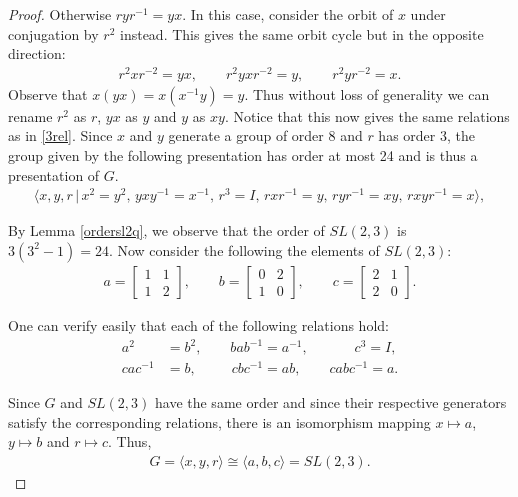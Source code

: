 \begin{proof}
Otherwise $r y r^{-1} = yx$. In this case, consider the orbit of $x$ under conjugation by $r^2$ instead. This gives the same orbit cycle but in the opposite direction:
\begin{align*} r^2 x r^{-2} = yx, \qquad r^2 yx r^{-2} = y, \qquad r^2 y r^{-2} = x.
\end{align*}
Observe that $x(yx) = x (x^{-1} y) = y$. Thus without loss of generality we can rename $r^2$ as $r$, $yx$ as $y$ and $y$ as $xy$. Notice that this now gives the same relations as in \eqref{3rel}. Since $x$ and $y$ generate a group of order 8 and $r$ has order 3, the group given by the following presentation has order at most 24 and is thus a presentation of $G$. 
\begin{align*} \langle x, y, r \, |  \, x^2= y^2, \, y x y^{-1} = x^{-1}, \, r^3 = I, \, r x r^{-1} = y, \, r y r^{-1} = xy, \, r xy r^{-1} = x \rangle,
\end{align*}

By Lemma \ref{ordersl2q}, we observe that the order of $SL(2,3)$ is $3(3^2-1) = 24$. Now consider the following the elements of $SL(2,3)$:
\begin{align*} a = \begin{bmatrix} 1 & 1 \\ 1 & 2 \end{bmatrix}, \qquad b = \begin{bmatrix} 0 & 2 \\ 1 & 0 \end{bmatrix}, \qquad c = \begin{bmatrix} 2 & 1 \\ 2 & 0 \end{bmatrix}.
\end{align*}

One can verify easily that each of the following relations hold:
\begin{align*} a^2 &= b^2, \qquad b a b^{-1} = a^{-1}, \qquad \quad \; c^3 = I, 
\\ c a c^{-1} &= b,  \qquad \; \: c b c^{-1} = ab, \qquad \! c ab c^{-1} = a.
\end{align*}

Since $G$ and $SL(2,3)$ have the same order and since their respective generators satisfy the corresponding relations, there is an isomorphism mapping $x \mapsto a$, $y \mapsto b$ and $r \mapsto c$. Thus,
\begin{align*} G = \langle x, y, r \rangle \cong \langle a, b, c \rangle = SL(2,3). 
\end{align*} 
\end{proof}
